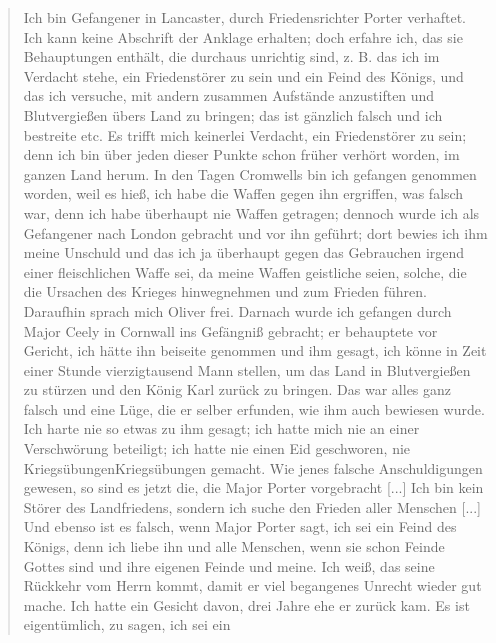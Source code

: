 \bigskip \begin{quote}

  Ich bin Gefangener in Lancaster, durch Friedensrichter
  Porter verhaftet. 
  Ich kann keine Abschrift der Anklage erhalten;
  doch erfahre ich, das sie Behauptungen enthält, die durchaus 
  unrichtig sind, z. B. das ich im Verdacht stehe, ein Friedenstörer
  zu sein und ein Feind des Königs, und das ich versuche, mit
  andern zusammen Aufstände anzustiften und Blutvergießen übers
  Land zu bringen; das ist gänzlich falsch und ich bestreite etc. Es
  trifft mich keinerlei Verdacht, ein Friedenstörer zu sein; denn
  ich bin über jeden dieser Punkte schon früher verhört worden, im
  ganzen Land herum. In den Tagen Cromwells bin ich gefangen
  genommen worden, weil es hieß, ich habe die Waffen 
  gegen ihn ergriffen, was falsch war, denn ich habe überhaupt nie
  Waffen getragen; dennoch wurde ich als Gefangener nach London 
  gebracht und vor ihn geführt; dort bewies ich ihm meine Unschuld
  und das ich ja überhaupt gegen das Gebrauchen irgend einer
  fleischlichen Waffe sei, da meine Waffen geistliche seien, solche,
  die die Ursachen des Krieges hinwegnehmen und zum Frieden
  führen. Daraufhin sprach mich Oliver frei. Darnach wurde ich
  gefangen durch Major Ceely in Cornwall 
   ins Gefängniß
  gebracht; er behauptete vor Gericht, ich hätte ihn beiseite 
  genommen und ihm gesagt, ich könne in Zeit einer Stunde 
  vierzigtausend Mann stellen, um das Land in Blutvergießen zu stürzen
  und den König Karl zurück zu bringen. 
  Das war alles ganz
  falsch und eine Lüge, die er selber erfunden, wie ihm auch bewiesen 
  wurde. Ich harte nie so etwas zu ihm gesagt; ich hatte
  mich nie an einer Verschwörung beteiligt; ich hatte nie einen Eid
  geschworen, nie Kriegsübungen\indexname{Kriegsübungen} 
  gemacht. Wie jenes falsche 
  Anschuldigungen gewesen, so sind es jetzt die, die Major Porter 
  vorgebracht [...] Ich bin kein Störer des Landfriedens, sondern
  ich suche den Frieden aller Menschen [...] Und ebenso ist es
  falsch, wenn Major Porter sagt, ich sei ein Feind des Königs,
  denn ich liebe ihn und alle Menschen, wenn sie schon Feinde
  Gottes sind und ihre eigenen Feinde und meine. Ich weiß, das
  seine Rückkehr vom Herrn kommt, damit er viel begangenes Unrecht 
  wieder gut mache. Ich hatte ein Gesicht davon, drei Jahre
  ehe er zurück kam. Es ist eigentümlich, zu sagen, ich sei ein

\end{quote}
